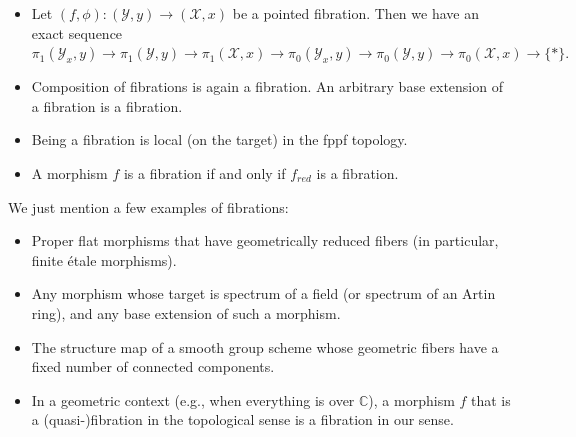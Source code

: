 \documentclass{amsart}
\theoremstyle{definition}
\theoremstyle{remark}
\theoremstyle{remark}
\newcommand{\X}{\mathcal{X}}
\newcommand{\Y}{\mathcal{Y}}
\newcommand{\pX}{\pi_1(\X,x)}
\newcommand{\pY}{\pi_1(\Y,y)}
\let\:=\colon
\begin{document}
{\small
\begin{itemize}

\item[$\triangleright$] Let $(f,\phi) \: (\Y,y) \to (\X,x)$ be a pointed
fibration. Then we have an exact sequence \\ $\pi_1(\Y_x,y) \to
\pY \to \pX  \to  \pi_0(\Y_x,y) \to  \pi_0(\Y,y) \to \pi_0(\X,x)
\to \{*\}.$

\item[$\triangleright$] Composition of fibrations is again a fibration.
An arbitrary base extension of a fibration is a fibration.

\item[$\triangleright$] Being a fibration is local (on the target) in the fppf topology.

\item[$\triangleright$] A morphism $f$ is a fibration if and only if $f_{red}$ is a fibration.
\end{itemize}
}

We just mention a few examples of fibrations:

\begin{itemize}

\item[$\mathbf{i}$)] Proper flat morphisms that have geometrically reduced fibers (in particular,
finite \'{e}tale morphisms).

\item[$\mathbf{ii}$)] Any morphism whose target is spectrum of a field (or spectrum of an Artin ring),
and any base extension of such a morphism.

\item[$\mathbf{iii}$)] The structure map of a smooth group scheme whose geometric fibers have a fixed
number of connected components.

\item[$\mathbf{iv}$)] In a geometric context (e.g., when everything is over $\mathbb{C}$), a morphism
$f$ that is a (quasi-)fibration in the topological sense is a
fibration in our sense.
\end{itemize}
\end{document}
